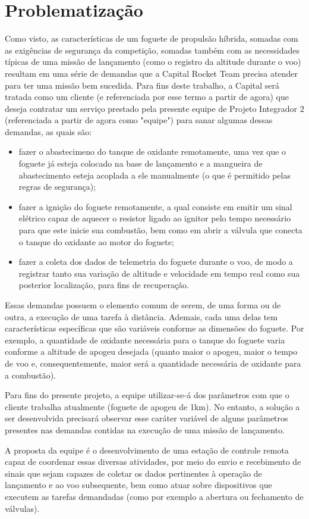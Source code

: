 \section{Problematização}

Como visto, as características de um foguete de propulsão híbrida, somadas com as exigências de segurança da competição, somadas também com as necessidades típicas de uma missão de lançamento (como o registro da altitude durante o voo) resultam em uma série de demandas que a Capital Rocket Team precisa atender para ter uma missão bem sucedida. Para fins deste trabalho, a Capital será tratada como um cliente (e referenciada por esse termo a partir de agora) que deseja contratar um serviço prestado pela presente equipe de Projeto Integrador 2 (referenciada a partir de agora como "equipe") para sanar algumas dessas demandas, as quais são:
\begin{itemize}
    \item fazer o abastecimeno do tanque de oxidante remotamente, uma vez que o foguete já esteja colocado na base de lançamento e a mangueira de abastecimento esteja acoplada a ele manualmente (o que é permitido pelas regras de segurança);
    \item fazer a ignição do foguete remotamente, a qual consiste em emitir um sinal elétrico capaz de aquecer o resistor ligado ao ignitor pelo tempo necessário para que este inicie sua combustão, bem como em abrir a válvula que conecta o tanque do oxidante ao motor do foguete;
    \item fazer a coleta dos dados de telemetria do foguete durante o voo, de modo a registrar tanto sua variação de altitude e velocidade em tempo real como sua posterior localização, para fins de recuperação.
\end{itemize}
\par Essas demandas possuem o elemento comum de serem, de uma forma ou de outra, a execução de uma tarefa à distância. Ademais, cada uma delas tem características específicas que são variáveis conforme as dimensões do foguete. Por exemplo, a quantidade de oxidante necessária para o tanque do foguete varia conforme a altitude de apogeu desejada (quanto maior o apogeu, maior o tempo de voo e, consequentemente, maior será a quantidade necessária de oxidante para a combustão).
\par Para fins do presente projeto, a equipe utilizar-se-á dos parâmetros com que o cliente trabalha atualmente (foguete de apogeu de 1km). No entanto, a solução a ser desenvolvida precisará observar esse caráter variável de alguns parâmetros presentes nas demandas contidas na execução de uma missão de lançamento.
\par A proposta da equipe é o desenvolvimento de uma estação de controle remota capaz de coordenar essas diversas atividades, por meio do envio e recebimento de sinais que sejam capazes de coletar os dados pertinentes à operação de lançamento e ao voo subsequente, bem como atuar sobre dispositivos que executem as tarefas demandadas (como por exemplo a abertura ou fechamento de válvulas).


